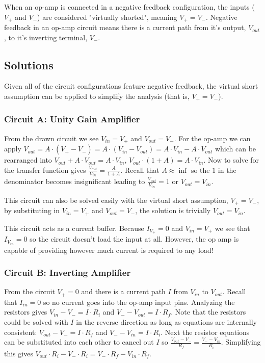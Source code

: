 \documentclass[main.tex]{subfiles}
\begin{document}
\noindent When an op-amp is connected in a negative feedback configuration, the inputs ($V_{+}$ and $V_{-}$) are considered "virtually shorted", meaning $V_{+} = V_{-}$. Negative feedback in an op-amp circuit means there is a current path from it's output, $V_{out}$, to it's inverting terminal, $V_{-}$.


\subsection{Solutions}
Given all of the circuit configurations feature negative feedback, the virtual short assumption can be applied to simplify the analysis (that is, $V_{+} = V_{-}$).



\subsubsection{Circuit A: Unity Gain Amplifier}
From the drawn circuit we see $V_{in} = V_{+}$ and $V_{out} = V_{-}$. For the op-amp we can apply $V_{out} = A \cdot (V_{+} - V_{-}) = A \cdot (V_{in} - V_{out}) = A \cdot V_{in} - A \cdot V_{out}$ which can be rearranged into $V_{out} + A \cdot V_{out} = A \cdot V_{in}$, $V_{out} \cdot (1 + A) = A \cdot V_{in}$. Now to solve for the transfer function gives $\frac{V_{out}}{V_{in}} = \frac{A}{1+A}$. Recall that $A \approx \inf$ so the $1$ in the denominator becomes insignificant leading to $\frac{V_{out}}{V_{in}} = 1$ or $V_{out} = V_{in}$.

This circuit can also be solved easily with the virtual short assumption, $V_{+} = V_{-}$, by substituting in $V_{in} = V_{+}$ and $V_{out} = V_{-}$, the solution is trivially $V_{out} = V_{in}$.

This circuit acts as a current buffer. Because $I_{V_{+}} = 0$ and $V_{in} = V_{+}$ we see that $I_{V_{in}} = 0$ so the circuit doesn't load the input at all. However, the op amp is capable of providing however much current is required to any load! 

\subsubsection{Circuit B: Inverting Amplifier}
From the circuit $V_{+} = 0$ and there is a current path $I$ from $V_{in}$ to $V_{out}$. Recall that $I_{in} = 0$ so no current goes into the op-amp input pins. Analyzing the resistors gives $V_{in} - V_{-} = I \cdot R_i$ and $V_{-} - V_{out} = I \cdot R_f$. Note that the resistors could be solved with $I$ in the reverse direction as long as equations are internally consistent: $V_{out} - V_{-} = I \cdot R_f$ and $V_{-} - V_{in} = I \cdot R_i$. Next the resistor equations can be substituted into each other to cancel out $I$ so $\frac{V_{out} - V_{-}}{R_f} = \frac{V_{-} - V_{in}}{R_i}$. Simplifying this gives $V_{out} \cdot R_i - V_{-} \cdot R_i = V_{-} \cdot R_f - V_{in} \cdot R_f$. 
\end{document}
